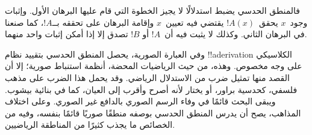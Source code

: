 \documentclass[../../../include/open-logic-section]{subfiles}
\begin{document}
فالمنطق الحدسي يضبط استدلالًا لا يجيز الخطوة التي قام عليها البرهان الأول.
وإثبات وجود~$x$ يحقق~$!A(x)$ يقتضي فيه تعيين~$x$ وإقامة البرهان على
تحققه بــ$!A$، كما صنعنا في البرهان الثاني. وكذلك لا يثبت فيه أن~$!A$ أو
$!B$ تصدق إلا إذا أمكن إثبات واحد منهما.

وفي العبارة الصورية، يحصل المنطق الحدسي بتقييد نظام !!a{derivation}
الكلاسيكي على وجه مخصوص. وهذه، من حيث الرياضيات المحضة، أنظمة استنباط
صورية؛ إلا أن القصد منها تمثيل ضرب من الاستدلال الرياضي. وقد يحمل هذا
الضرب على مذهب فلسفي، كحدسية براور، أو يختار لأنه أصرح وأقرب إلى العيان،
كما في بنائية بيشوب. ويبقى البحث قائمًا في وفاء الرسم الصوري بالدافع غير
الصوري. وعلى اختلاف المذاهب، يصح أن يدرس المنطق الحدسي بوصفه منطقًا
صوريًا قائمًا بنفسه، وفيه من الخصائص ما يجذب كثيرًا من المناطقة الرياضيين.
\end{document}
